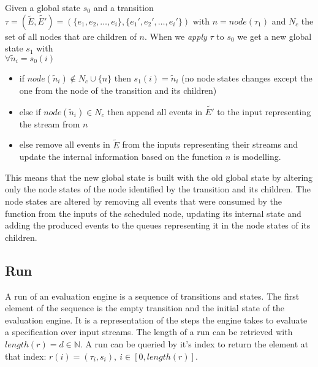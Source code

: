 \begin{definition}[name = Application of a Transition on a State]\label{sec:concepts:def:application_transition}
  Given a global state \(s_0\) and a transition \(\tau = (\widetilde{E}, \widetilde{E'}) = (\{e_1,e_2,\dots,e_i\}, \{e_1',e_2',\dots,e_i'\})\) with \(n = \mathit{node}(\tau_1)\) and \(N_c\) the set of all nodes that are children of \(n\).
  When we \emph{apply} \(\tau\) to \(s_0\) we get a new global state \(s_1\) with\\
  \(\forall \widetilde{n}_i = s_0(i)\)
  \begin{itemize}
    \item if \(\mathit{node}(\widetilde{n}_i) \not\in N_c \cup \{n\} \text{ then } s_1(i) = \widetilde{n}_i\) (no node states changes except the one from the node of the transition and its children)
    \item else if \(\mathit{node}(\widetilde{n}_i) \in N_c\) then append all events in \(\widetilde{E'}\) to the input representing the stream from \(n\)
    \item else remove all events in \(\widetilde{E}\) from the inputs representing their streams and update the internal information based on the function \(n\) is modelling.
  \end{itemize}
\end{definition}

This means that the new global state is built with the old global state by altering only the node states of the node identified by the transition and its children.
The node states are altered by removing all events that were consumed by the function from the inputs of the scheduled node, updating its internal state and adding the produced events to the queues representing it in the node states of its children.

\subsection{Run}
\label{sec:concepts:def:run}

A run of an evaluation engine is a sequence of transitions and states.
The first element of the sequence is the empty transition and the initial state of the evaluation engine.
It is a representation of the steps the engine takes to evaluate a specification over input streams.
The length of a run can be retrieved with \(\mathit{length}(r) = d \in \mathbb{N}\).
A run can be queried by it's index to return the element at that index: \(r(i)=(\tau_i, s_i),\ i \in [0, \mathit{length}(r)]\).

